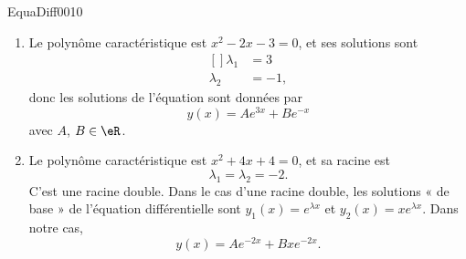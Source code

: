 \begin{corrige}{EquaDiff0010}

\begin{enumerate}

\item
	Le polynôme caractéristique est $x^2-2x-3=0$, et ses solutions sont
	\begin{equation}
		\begin{aligned}[]
			\lambda_1&=3\\
			\lambda_2&=-1,
		\end{aligned}
	\end{equation}
	donc les solutions de l'équation sont données par
	\begin{equation}
		y(x)=A e^{3x}+B e^{-x}
	\end{equation}
	avec $A$, $B\in\eR$.
	
\item
	Le polynôme caractéristique est $x^2+4x+4=0$, et sa racine est
	\begin{equation}
		\lambda_1=\lambda_2=-2.
	\end{equation}
	C'est une racine double. Dans le cas d'une racine double, les solutions « de base »  de l'équation différentielle sont $y_1(x)= e^{\lambda x}$ et $y_2(x)=x e^{\lambda x}$. Dans notre cas,
	\begin{equation}
		y(x)=A e^{-2x}+Bx e^{-2x}.
	\end{equation}
	

\end{enumerate}
\end{corrige}
